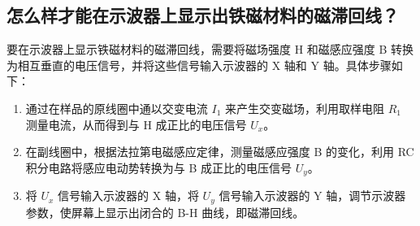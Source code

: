 \documentclass[]{../template/Report}%
\begin{document}
\begin{fullreportonly}
\subsection{怎么样才能在示波器上显示出铁磁材料的磁滞回线？}
要在示波器上显示铁磁材料的磁滞回线，需要将磁场强度 H 和磁感应强度 B 转换为相互垂直的电压信号，并将这些信号输入示波器的 X 轴和 Y 轴。具体步骤如下：
\begin{enumerate}
    \item 通过在样品的原线圈中通以交变电流 $I_1$ 来产生交变磁场，利用取样电阻 $R_1$ 测量电流，从而得到与 H 成正比的电压信号 $U_x$。
    \item 在副线圈中，根据法拉第电磁感应定律，测量磁感应强度 B 的变化，利用 RC 积分电路将感应电动势转换为与 B 成正比的电压信号 $U_y$。
    \item 将 $U_x$ 信号输入示波器的 X 轴，将 $U_y$ 信号输入示波器的 Y 轴，调节示波器参数，使屏幕上显示出闭合的 B-H 曲线，即磁滞回线。
\end{enumerate}

\end{fullreportonly}
\insertnotes
\end{document}
